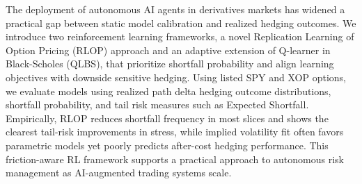 The deployment of autonomous AI agents in derivatives markets has widened a practical gap between static model calibration and realized hedging outcomes. We introduce two reinforcement learning frameworks, a novel Replication Learning of Option Pricing (RLOP) approach and an adaptive extension of Q-learner in Black-Scholes (QLBS), that prioritize shortfall probability and align learning objectives with downside sensitive hedging. Using listed SPY and XOP options, we evaluate models using realized path delta hedging outcome distributions, shortfall probability, and tail risk measures such as Expected Shortfall. Empirically, RLOP reduces shortfall frequency in most slices and shows the clearest tail-risk improvements in stress, while implied volatility fit often favors parametric models yet poorly predicts after-cost hedging performance.
This friction-aware RL framework supports a practical approach to autonomous risk management as AI-augmented trading systems scale.

